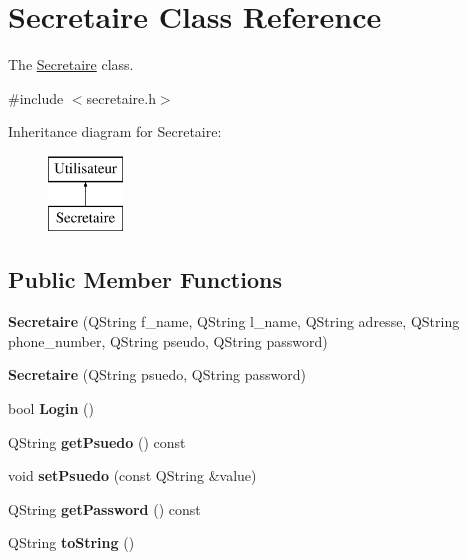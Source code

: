 \hypertarget{class_secretaire}{}\section{Secretaire Class Reference}
\label{class_secretaire}


The \mbox{\hyperlink{class_secretaire}{Secretaire}} class.  




{\ttfamily \#include $<$secretaire.\+h$>$}

Inheritance diagram for Secretaire\+:\begin{figure}[H]
\begin{center}
\leavevmode
\includegraphics[height=2.000000cm]{class_secretaire}
\end{center}
\end{figure}
\subsection*{Public Member Functions}
\begin{DoxyCompactItemize}
\item 
\mbox{\label{class_secretaire_ae399f6f7212bbe9ba514a3a827aa95d9}} 
{\bfseries Secretaire} (Q\+String f\+\_\+name, Q\+String l\+\_\+name, Q\+String adresse, Q\+String phone\+\_\+number, Q\+String pseudo, Q\+String password)
\item 
\mbox{\label{class_secretaire_a9df2696b2b6708755e7c4bee1be0d67a}} 
{\bfseries Secretaire} (Q\+String psuedo, Q\+String password)
\item 
\mbox{\label{class_secretaire_ae7eb96f900703ae3e74d6a40b60c7482}} 
bool {\bfseries Login} ()
\item 
\mbox{\label{class_secretaire_a1331945f37877493d3f9f0384bff5347}} 
Q\+String {\bfseries get\+Psuedo} () const
\item 
\mbox{\label{class_secretaire_aa43fc10abbaa9741fd4c98fcdd6e0ae6}} 
void {\bfseries set\+Psuedo} (const Q\+String \&value)
\item 
\mbox{\label{class_secretaire_ad3555274c8a2ef05af01273ff8513baa}} 
Q\+String {\bfseries get\+Password} () const
\item 
\mbox{\label{class_secretaire_aa7abbd05fc4b70e69f2c9d748f3e7b2a}} 
Q\+String {\bfseries to\+String} ()
\end{DoxyCompactItemize}
